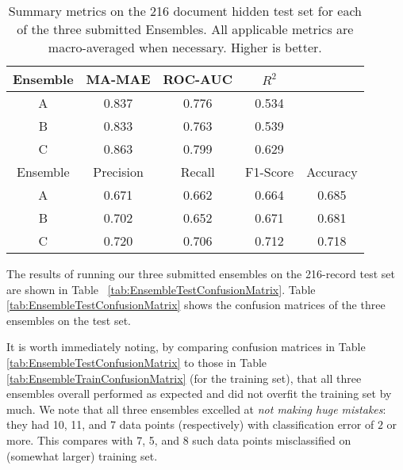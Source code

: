 \begin{table}
\centering
    \begin{tabular}{|c|c|c|c|c|}
        \hline
        \textsf{ Ensemble } & \textsf{ MA-MAE } & \textsf{ ROC-AUC } & \textsf{ $R^2$ } & \\
        \hline
       \cellcolor{gray!15} \textsf{ A } & 0.837 & 0.776 & 0.534 & \\ 
       \cellcolor{gray!15} \textsf{ B } & 0.833 & 0.763 & 0.539 & \\ 
       \cellcolor{gray!15} \textsf{ C } & \cellcolor{gray!15} 0.863 & \cellcolor{gray!15} 0.799 & \cellcolor{gray!15} 0.629 & \\ 
       \hline
        \textsf{ Ensemble } & \textsf{ Precision } & \textsf{ Recall } & \textsf{ F1-Score } & \textsf{ Accuracy } \\
        \hline
       \cellcolor{gray!15} \textsf{ A } & 0.671 & 0.662 & 0.664 & 0.685 \\ 
       \cellcolor{gray!15} \textsf{ B } & 0.702 & 0.652 & 0.671 & 0.681 \\ 
       \cellcolor{gray!15} \textsf{ C } & \cellcolor{gray!15} 0.720 & \cellcolor{gray!15} 0.706 & \cellcolor{gray!15} 0.712 & \cellcolor{gray!15} 0.718 \\ 
        \hline
    \end{tabular}
    \caption{Summary metrics on the 216 document hidden test set for each of the three submitted Ensembles. All applicable metrics are macro-averaged when necessary. Higher is better.}
    \label{tab:EnsembleTestSummaryMetrics}
\end{table}



The results of running our three submitted ensembles on the
216-record test set are shown in Table ~\ref{tab:EnsembleTestConfusionMatrix}.
Table \ref{tab:EnsembleTestConfusionMatrix} shows the confusion
matrices of the three ensembles on the test set.

It is worth immediately noting, by comparing confusion
matrices in  Table \ref{tab:EnsembleTestConfusionMatrix}
to those in Table \ref{tab:EnsembleTrainConfusionMatrix}
(for the training set), that all three ensembles overall
performed as expected and did not overfit the training
set by much.  We note that all three ensembles
 excelled at \textit{not making huge mistakes}:
they had 10, 11, and 7 data points (respectively) with classification
error of $2$ or more. This compares with 7, 5, and 8 such
data points misclassified on (somewhat larger) training set.

